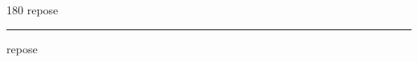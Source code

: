 
\begin{frame}
\begin{center}
\begin{turn}{180}
{\fontsize{2.5cm}{1em}\selectfont repose}
\end{turn}
\vspace{1em}\par  
\hrule
\vspace{1em}\par  
{\fontsize{2.5cm}{1em}\selectfont repose}
\end{center}
\end{frame}
